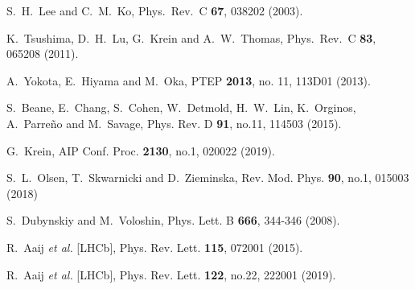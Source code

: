 \documentclass[prd,amsmath,twocolumn,floatfix,amssymb, preprintnumbers, linenumbers,nofootinbib, superscriptaddress]{revtex4}
\begin{document}
\begin{thebibliography}{99}
  
  S.~H.~Lee and C.~M.~Ko,
  Phys.\ Rev.\ C {\bf 67}, 038202 (2003). 
  
  K.~Tsushima, D.~H.~Lu, G.~Krein and A.~W.~Thomas,
  Phys.\ Rev.\ C {\bf 83}, 065208 (2011). 

  
  A.~Yokota, E.~Hiyama and M.~Oka,
  PTEP {\bf 2013}, no. 11, 113D01 (2013).

S.~Beane, E.~Chang, S.~Cohen, W.~Detmold, H.~W.~Lin, K.~Orginos, A.~Parreño and M.~Savage,
Phys. Rev. D \textbf{91}, no.11, 114503 (2015).


G.~Krein,
AIP Conf. Proc. \textbf{2130}, no.1, 020022 (2019).

S.~L.~Olsen, T.~Skwarnicki and D.~Zieminska,
Rev. Mod. Phys. \textbf{90}, no.1, 015003 (2018)


S.~Dubynskiy and M.~Voloshin,
Phys. Lett. B \textbf{666}, 344-346 (2008). 


R.~Aaij \textit{et al.} [LHCb],
Phys. Rev. Lett. \textbf{115}, 072001 (2015). 


R.~Aaij \textit{et al.} [LHCb],
Phys. Rev. Lett. \textbf{122}, no.22, 222001 (2019). 



\end{thebibliography}
\end{document}
